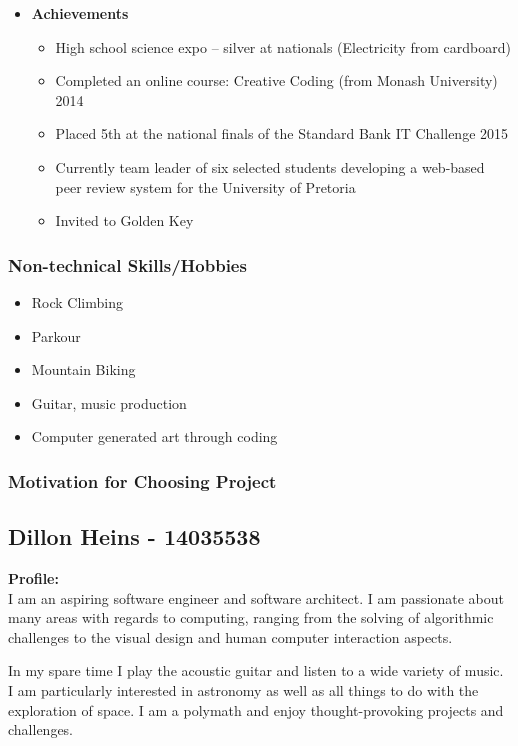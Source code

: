 \documentclass{article}
\begin{document}
\begin{itemize}
		\item \textbf{Achievements}
		\begin{itemize}
			\item High school science expo – silver at nationals (Electricity from cardboard)
			\item Completed an online course: Creative Coding (from Monash University) 2014
			\item Placed 5th at the national finals of the Standard Bank IT Challenge 2015
			\item Currently team leader of six selected students developing a web-based peer review system for the University of Pretoria
			\item Invited to Golden Key
		\end{itemize}
	\end{itemize}
	
	\subsubsection{Non-technical Skills/Hobbies}
	\begin{itemize}
		\item Rock Climbing
		\item Parkour
		\item Mountain Biking
		\item Guitar, music production
		\item Computer generated art through coding
	\end{itemize}
	\subsubsection{Motivation for Choosing Project}
	
	\cleardoublepage
	
	\subsection{Dillon Heins - 14035538}
	\textbf{Profile:}\\
	I am an aspiring software engineer and software architect. I am passionate about many areas with regards to computing, ranging from the solving of algorithmic challenges to the visual design and human computer interaction aspects.
	
	In my spare time I play the acoustic guitar and listen to a wide variety of music. I am particularly interested in astronomy as well as all things to do with the exploration of space. I am a polymath and enjoy thought-provoking projects and challenges.
\end{document}
